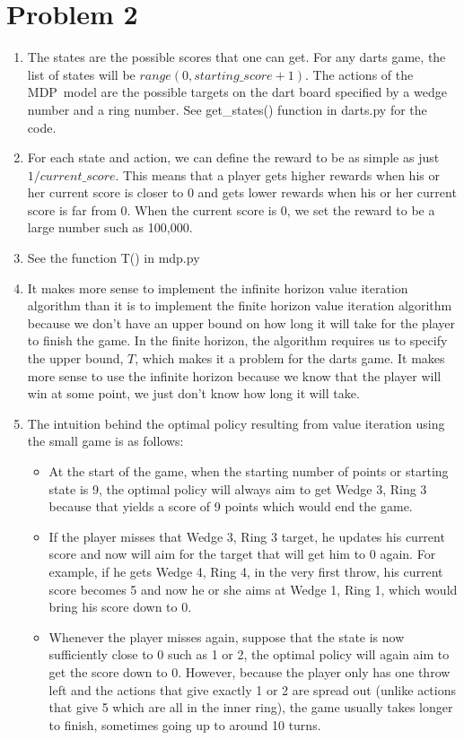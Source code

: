 \documentclass[12pt,letterpaper]{article}
\begin{document}
\section*{Problem 2}
\begin{enumerate}[label={(\alph*) }]
        \item The states are the possible scores that one can get. For any darts game, the list of states will be $range(0, starting\_score+1)$. The actions of the MDP\ model are the possible targets on the dart board specified by a wedge number and a ring number. See get\_states() function in darts.py for the code. 
        \item For each state and action, we can define the reward to be as simple as just $1/current\_score$. This means that a player gets higher rewards when his or her current score is closer to 0 and gets lower rewards when his or her current score is far from 0. When the current score is 0, we set the reward to be a large number such as 100,000.
        \item See the function T() in mdp.py
        \item It makes more sense to implement the infinite horizon value iteration algorithm than it is to implement the finite horizon value iteration algorithm because we don't have an upper bound on how long it will take for the player to finish the game. In the finite horizon, the algorithm requires us to specify the upper bound, $T$, which makes it a problem for the darts game. It makes more sense to use the infinite horizon because we know that the player will win at some point, we just don't know how long it will take. 
        \item The intuition behind the optimal policy resulting from value iteration using the small game is as follows:
                \begin{itemize}
                        \item At the start of the game, when the starting number of points or starting state is 9, the optimal policy will always aim to get Wedge 3, Ring 3 because that yields a score of 9 points which would end the game. 
                        \item If the player misses that Wedge 3, Ring 3 target, he updates his current score and now  will aim for the target that will get him to 0 again. For example, if he gets Wedge 4, Ring 4, in the very first throw, his current score becomes 5 and now he or she aims at Wedge 1, Ring 1, which would bring his score down to 0. 
                        \item Whenever the player misses again, suppose that the state is now sufficiently close to 0 such as 1 or 2, the optimal policy will again aim to get the score down to 0. However, because the player only has one throw left and the actions that give exactly 1 or 2 are spread out (unlike actions that give 5 which are all in the inner ring), the game usually takes longer to finish, sometimes going up to around 10 turns.  

\end{itemize}
\end{enumerate}
\end{document}
